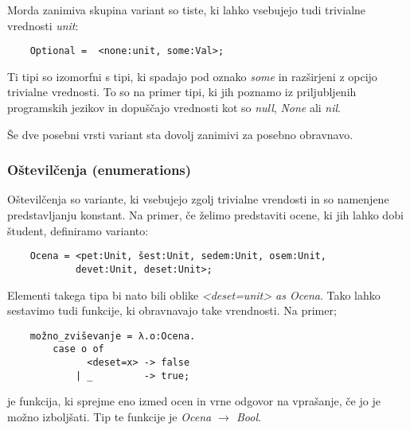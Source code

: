 \documentclass[a4paper]{report}
\begin{document}
Morda zanimiva skupina variant so tiste, ki lahko vsebujejo tudi trivialne vrednosti \emph{unit}:
\begin{lstlisting}
    Optional =  <none:unit, some:Val>;
\end{lstlisting}
Ti tipi so izomorfni s tipi, ki spadajo pod oznako \emph{some} in razširjeni z opcijo trivialne vrednosti. To so na primer tipi, ki jih poznamo iz priljubljenih programskih jezikov in dopuščajo 
vrednosti kot so \emph{null}, \emph{None} ali \emph{nil}.

Še dve posebni vrsti variant sta dovolj zanimivi za posebno obravnavo.

\subsubsection{Oštevilčenja (enumerations)}
Oštevilčenja so variante, ki vsebujejo zgolj trivialne vrendosti in so namenjene predstavljanju konstant. Na primer, če želimo predstaviti ocene, ki jih lahko dobi študent, definiramo varianto:
\begin{lstlisting}
    Ocena = <pet:Unit, šest:Unit, sedem:Unit, osem:Unit, 
            devet:Unit, deset:Unit>;
\end{lstlisting}
Elementi takega tipa bi nato bili oblike \emph{<deset=unit> as Ocena}. Tako lahko sestavimo tudi funkcije, ki obravnavajo take vrendnosti. Na primer;
\begin{lstlisting}
    možno_zviševanje = λ.o:Ocena.
        case o of 
              <deset=x> -> false
            | _         -> true;
\end{lstlisting}
je funkcija, ki sprejme eno izmed ocen in vrne odgovor na vprašanje, če jo je možno izboljšati. Tip te funkcije je \emph{Ocena $\rightarrow$ Bool}.
\end{document}
